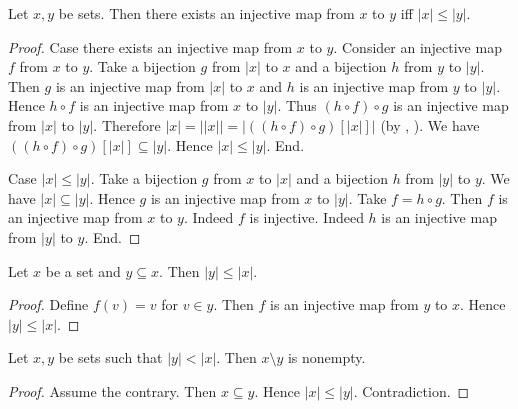 \documentclass[10pt]{article}
\begin{document}
  \begin{forthel}
    \begin{proposition}[id=SET_THEORY_06_407116133171200,printid]
      Let $x, y$ be sets.
      Then there exists an injective map from $x$ to $y$ iff $|x| \leq |y|$.
    \end{proposition}
    \begin{proof}
      Case there exists an injective map from $x$ to $y$.
        Consider an injective map $f$ from $x$ to $y$.
        Take a bijection $g$ from $|x|$ to $x$ and a bijection $h$ from $y$ to $|y|$.
        Then $g$ is an injective map from $|x|$ to $x$ and $h$ is an injective map from $y$ to $|y|$.
        Hence $h \circ f$ is an injective map from $x$ to $|y|$.
        Thus $(h \circ f) \circ g$ is an injective map from $|x|$ to $|y|$.
        Therefore $|x|
          = ||x||
          = |((h \circ f) \circ g)[|x|]|$
        (by , ).
        We have $((h \circ f) \circ g)[|x|] \subseteq |y|$.
        Hence $|x| \leq |y|$.
      End.

      Case $|x| \leq |y|$.
        Take a bijection $g$ from $x$ to $|x|$ and a bijection $h$ from $|y|$ to $y$.
        We have $|x| \subseteq |y|$.
        Hence $g$ is an injective map from $x$ to $|y|$.
        Take $f = h \circ g$.
        Then $f$ is an injective map from $x$ to $y$.
        Indeed $f$ is injective.
        Indeed $h$ is an injective map from $|y|$ to $y$.
      End.
    \end{proof}
  \end{forthel}

  \begin{forthel}
    \begin{corollary}[id=SET_THEORY_06_4944303633727488,printid]
      Let $x$ be a set and $y \subseteq x$.
      Then $|y| \leq |x|$.
    \end{corollary}
    \begin{proof}
      Define $f(v) = v$ for $v \in y$.
      Then $f$ is an injective map from $y$ to $x$.
      Hence $|y| \leq |x|$.
    \end{proof}
  \end{forthel}

  \begin{forthel}
    \begin{corollary}[id=SET_THEORY_06_7746592696172544,printid]
      Let $x, y$ be sets such that $|y| < |x|$.
      Then $x \setminus y$ is nonempty.
    \end{corollary}
    \begin{proof}
      Assume the contrary.
      Then $x \subseteq y$.
      Hence $|x| \leq |y|$.
      Contradiction.
    \end{proof}
  \end{forthel}
\end{document}
